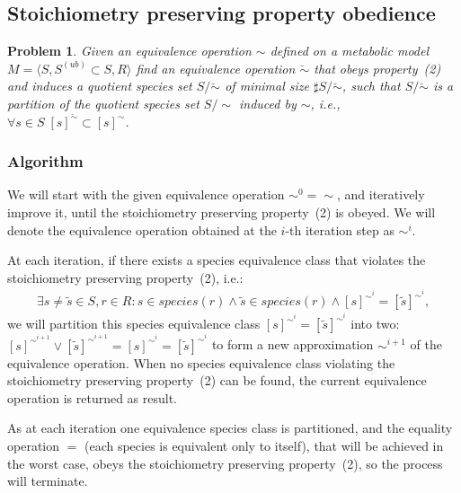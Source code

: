 \documentclass[10pt]{bmc_article}
\newenvironment{bmcformat}{\baselineskip20pt\sloppy\setboolean{publ}{false}}{\baselineskip20pt\sloppy}
\begin{document}
\begin{bmcformat}
\subsection*{Stoichiometry preserving property obedience}
\newtheorem{p2}[pbm]{Problem}
\begin{p2}
Given an equivalence operation $\sim$ defined on a metabolic model $M=\langle S, S^{(ub)}\subset{S}, R \rangle$ find an equivalence operation $\breve{\sim}$ that obeys property~(2) and induces a quotient species set $S/\breve{\sim}$ of minimal size $\sharp S/\breve{\sim}$, such that $S/\breve{\sim}$ is a partition of the quotient species set $S/\sim$ induced by $\sim$, i.e., $\forall s \in S \; [s]^{\breve{\sim}} \subset [s]^{\sim} $. 
\end{p2}
\subsubsection*{Algorithm}
We will start with the given equivalence operation $\sim^0 = \sim$, and iteratively improve it, until the stoichiometry preserving property~(2) is obeyed. We will denote the equivalence operation obtained at the $i$-th iteration step as $\sim^i$.

At each iteration, if there exists a species equivalence class that violates the stoichiometry preserving property~(2), i.e.:
\begin{align*}
\exists s \neq \tilde{s} \in S, r \in R: s \in species(r) \land \tilde{s} \in species(r) \land  [s]^{{\sim}^i} = [\tilde{s}]^{{\sim}^i},
\end{align*}
we will partition this species equivalence class $[s]^{{\sim}^i} = [\tilde{s}]^{{\sim}^i}$ into two: $[s]^{{\sim}^{i+1}}  \vee [\tilde{s}]^{{\sim}^{i+1}}  = [s]^{{\sim}^i} = [\tilde{s}]^{{\sim}^i} $ to form a new approximation ${\sim}^{i+1}$ of the equivalence operation. When no species equivalence class violating the stoichiometry preserving property~(2) can be found, the current equivalence operation is returned as result.

As at each iteration one equivalence species class is partitioned, and the equality operation $=$ (each species is equivalent only to itself), that will be achieved in the worst case, obeys the stoichiometry preserving property~(2), so the process will terminate. \\



\end{bmcformat}
\end{document}
